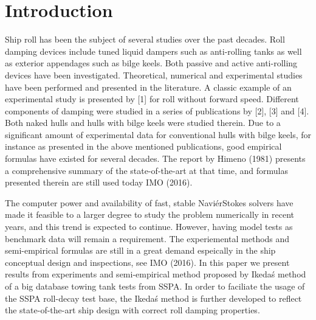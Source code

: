 \section{Introduction}
\label{se:introduction}

%    
			
Ship roll has been the subject of several studies over the past decades. Roll damping devices include tuned liquid dampers such as anti-rolling tanks as well as exterior appendages such as bilge keels. Both passive and active anti-rolling devices have been investigated. Theoretical, numerical and experimental studies have been performed and presented in the literature. A classic example of an experimental study is presented by [1] for roll without forward speed. Different components of damping were studied in a series of publications by [2], [3] and [4]. Both naked hulls and hulls with bilge keels were
studied therein. Due to a significant amount of
experimental data for conventional hulls with bilge keels, for instance as presented in the above mentioned publications, good empirical formulas have existed for several decades. The report by Himeno (1981) presents a comprehensive summary of the state-of-the-art at that time, and formulas presented therein are still used today IMO (2016).

The computer power and availability of fast, stable NaviérStokes solvers have made it feasible to a larger degree to study the problem numerically in recent years, and this trend is expected to continue. However, having model tests as benchmark data will remain a requirement. The experiemental methods and semi-empirical formulas are still in a great demand espeically in the ship conceptual design and inspections, see IMO (2016). In this paper we present results from experiments and semi-empirical method proposed by Ikeda\'s method of a big database towing tank tests from SSPA. In order to faciliate the usage of the SSPA roll-decay test base, the Ikeda\'s method is further developed to reflect the state-of-the-art ship design with correct roll damping properties. 


